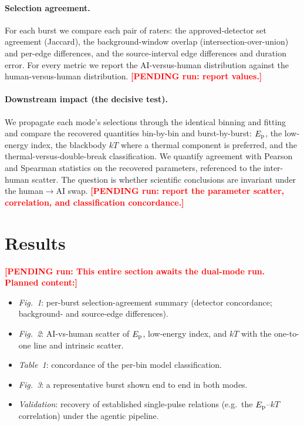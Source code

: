 \documentclass[twocolumn]{aastex631}
\newcommand{\PENDING}[1]{\textbf{\textcolor{red}{[PENDING run: #1]}}}
\newcommand{\Ep}{E_{\rm p}}
\newcommand{\kT}{kT}
\begin{document}
\paragraph{Selection agreement.} For each burst we compare each pair of raters: the
approved-detector set agreement (Jaccard), the background-window overlap
(intersection-over-union) and per-edge differences, and the source-interval edge
differences and duration error. For every metric we report the AI-versus-human
distribution against the human-versus-human distribution. \PENDING{report values.}

\paragraph{Downstream impact (the decisive test).} We propagate each mode's
selections through the identical binning and fitting and compare the recovered
quantities bin-by-bin and burst-by-burst: $\Ep$, the low-energy index, the
blackbody $\kT$ where a thermal component is preferred, and the
thermal-versus-double-break classification. We quantify
agreement with Pearson and Spearman statistics on the recovered parameters,
referenced to the inter-human scatter.
The question is whether scientific conclusions are invariant under the
human$\rightarrow$AI swap. \PENDING{report the parameter scatter, correlation, and
classification concordance.}

\section{Results} \label{sec:results}
\PENDING{This entire section awaits the dual-mode run. Planned content:}
\begin{itemize}
\item \emph{Fig.~1}: per-burst selection-agreement summary (detector concordance;
  background- and source-edge differences).
\item \emph{Fig.~2}: AI-vs-human scatter of $\Ep$, low-energy index, and $\kT$ with
  the one-to-one line and intrinsic scatter.
\item \emph{Table~1}: concordance of the per-bin model classification.
\item \emph{Fig.~3}: a representative burst shown end to end in both modes.
\item \emph{Validation}: recovery of established single-pulse relations
  (e.g.\ the $\Ep$--$\kT$ correlation) under the agentic pipeline.
\end{itemize}
\end{document}
